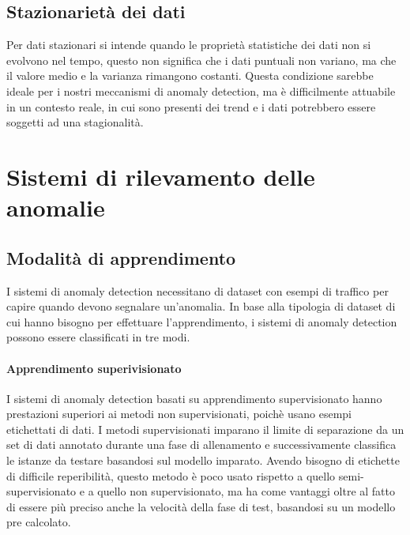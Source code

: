 \subsection{Stazionarietà dei dati}
Per dati stazionari si intende quando le proprietà statistiche dei dati non si evolvono nel tempo, questo non significa che i dati puntuali non variano, ma che il valore medio e la varianza rimangono costanti. Questa condizione sarebbe ideale per i nostri meccanismi di anomaly detection, ma è difficilmente attuabile in un contesto reale, in cui sono presenti dei trend e i dati potrebbero essere soggetti ad una stagionalità.

\section{Sistemi di rilevamento delle anomalie}

\subsection{Modalità di apprendimento}


I sistemi di anomaly detection necessitano di dataset con esempi di traffico per capire quando devono segnalare un'anomalia. In base alla tipologia di dataset di cui hanno bisogno per effettuare l'apprendimento, i sistemi di anomaly detection possono essere classificati in tre modi.

\paragraph{Apprendimento superivisionato}

I sistemi di anomaly detection basati su apprendimento supervisionato hanno prestazioni superiori ai metodi non supervisionati, poichè usano esempi etichettati di dati. I metodi supervisionati imparano il limite di separazione da un set di dati annotato durante una fase di allenamento e successivamente classifica le istanze da testare basandosi sul modello imparato. Avendo bisogno di etichette di difficile reperibilità, questo metodo è poco usato rispetto a quello semi-supervisionato e a quello non supervisionato, ma ha come vantaggi oltre al fatto di essere più preciso anche la velocità della fase di test, basandosi su un modello pre calcolato.

